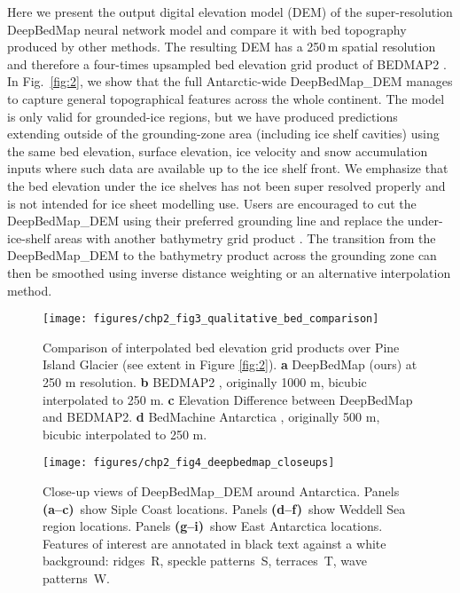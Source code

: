 Here we present the output digital elevation model (DEM) of the super-resolution DeepBedMap neural network model and compare it with bed topography produced by other methods.
The resulting DEM has a 250\,\unit{m} spatial resolution and therefore a four-times upsampled bed elevation grid product of BEDMAP2 \citep{FretwellBedmap2improvedice2013}.
In Fig.~\ref{fig:2}, we show that the full Antarctic-wide DeepBedMap\_DEM manages to capture general topographical features across the whole continent.
The model is only valid for grounded-ice regions, but we have produced predictions extending outside of the grounding-zone area (including ice shelf cavities) using the same bed elevation, surface elevation, ice velocity and snow accumulation inputs where such data are available up to the ice shelf front.
We emphasize that the bed elevation under the ice shelves has not been super resolved properly and is not intended for ice sheet modelling use.
Users are encouraged to cut the DeepBedMap\_DEM using their preferred grounding line \citep[e.g.][]{BindschadlerGettingAntarcticanew2011,RignotAntarcticgroundingline2011,MouginotMEaSURESAntarcticBoundaries2017} and replace the under-ice-shelf areas with another bathymetry grid product \citep[e.g.][]{GEBCOCompilationGroupGEBCO2020Grid2020}.
The transition from the DeepBedMap\_DEM to the bathymetry product across the grounding zone can then be smoothed using inverse distance weighting or an alternative interpolation method.

\begin{figure*}[htbp]
  \texttt{[image: figures/chp2\_fig3\_qualitative\_bed\_comparison]}
  \caption[2-D comparison of interpolated bed elevation grid products over Pine Island Glacier]{
    Comparison of interpolated bed elevation grid products over Pine Island Glacier (see extent in Figure \ref{fig:2}).
    \textbf{a} DeepBedMap (ours) at 250 m resolution.
    \textbf{b} BEDMAP2 \citep{FretwellBedmap2improvedice2013}, originally 1000 m, bicubic interpolated to 250 m.
    \textbf{c} Elevation Difference between DeepBedMap and BEDMAP2.
    \textbf{d} BedMachine Antarctica \citep{MorlighemMEaSUREsBedMachineAntarctica2019}, originally 500 m, bicubic interpolated to 250 m.
  }
  \label{fig:3}
\end{figure*}

\begin{figure*}[htbp]
  \texttt{[image: figures/chp2\_fig4\_deepbedmap\_closeups]}
  \caption[2-D Close-up views of DeepBedMap\_DEM over Antarctica]{
    Close-up views of DeepBedMap\_DEM around Antarctica.
    Panels \textbf{(a--c)}~show Siple Coast locations.
    Panels \textbf{(d--f)}~show Weddell Sea region locations.
    Panels \textbf{(g--i)}~show East Antarctica locations.
    Features of interest are annotated in black text against a white background:
    ridges~R, speckle patterns~S, terraces~T, wave patterns~W.
  }
  \label{fig:4}
\end{figure*}

